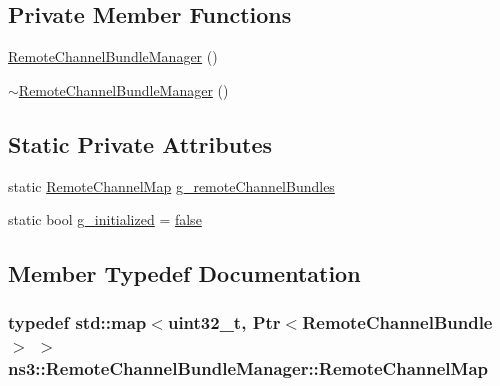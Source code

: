 \subsection*{Private Member Functions}
\begin{DoxyCompactItemize}
\item 
\hyperlink{classns3_1_1RemoteChannelBundleManager_abe730901ca99d2b0759d2b0113003ec2}{Remote\+Channel\+Bundle\+Manager} ()
\item 
\hyperlink{classns3_1_1RemoteChannelBundleManager_a3249c4eb1bdccd635788d62e45c20d5b}{$\sim$\+Remote\+Channel\+Bundle\+Manager} ()
\end{DoxyCompactItemize}
\subsection*{Static Private Attributes}
\begin{DoxyCompactItemize}
\item 
static \hyperlink{classns3_1_1RemoteChannelBundleManager_adb9c9a37cc4b94dd3286ca121a39bda1}{Remote\+Channel\+Map} \hyperlink{classns3_1_1RemoteChannelBundleManager_a4a3b963438e1f5a01a7bb0ae6feccba5}{g\+\_\+remote\+Channel\+Bundles}
\item 
static bool \hyperlink{classns3_1_1RemoteChannelBundleManager_afa3a0784e18ca183d475813fca1af0ce}{g\+\_\+initialized} = \hyperlink{lte__cqi__generation_8m_ab1bef239d413c4da139c4bac92cd657a}{false}
\end{DoxyCompactItemize}


\subsection{Member Typedef Documentation}
\subsubsection[{\texorpdfstring{Remote\+Channel\+Map}{RemoteChannelMap}}]{\setlength{\rightskip}{0pt plus 5cm}typedef std\+::map$<$uint32\+\_\+t, {\bf Ptr}$<${\bf Remote\+Channel\+Bundle}$>$ $>$ {\bf ns3\+::\+Remote\+Channel\+Bundle\+Manager\+::\+Remote\+Channel\+Map}\hspace{0.3cm}{\ttfamily [private]}}\hypertarget{classns3_1_1RemoteChannelBundleManager_adb9c9a37cc4b94dd3286ca121a39bda1}{}\label{classns3_1_1RemoteChannelBundleManager_adb9c9a37cc4b94dd3286ca121a39bda1}


